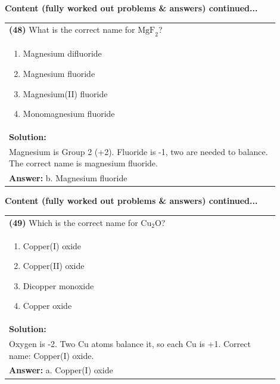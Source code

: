 \documentclass{article}
\begin{document}
{\noindent
{\large\textbf{Content (fully worked out problems & answers) continued...}}\\[0.2em]
\vspace{0.2cm}
\begin{tabular}{|p{0.9\linewidth}|}
\hline
\vspace{0.2cm}
\textbf{(48)} What is the correct name for $\text{MgF}_2$? \\
\begin{minipage}[t]{0.85\linewidth}
\begin{enumerate}[label=\alph*.]
\item Magnesium difluoride \
\item Magnesium fluoride \
\item Magnesium(II) fluoride \
\item Monomagnesium fluoride
\end{enumerate}
\end{minipage}\\
\hline
\vspace{0.2cm}
\textbf{Solution:} \\
Magnesium is Group 2 (+2). Fluoride is -1, two are needed to balance. The correct name is magnesium fluoride. \\
\hline
\vspace{0.2cm}
\textbf{Answer:} b. Magnesium fluoride \
\hline
\end{tabular}

\newpage
\noindent
{\large\textbf{Content (fully worked out problems \& answers) continued...}}\\[0.2em]
\vspace{0.2cm}
\begin{tabular}{|p{0.9\linewidth}|}
\hline
\vspace{0.2cm}
\textbf{(49)} Which is the correct name for $\text{Cu}_2\text{O}$? \\
\begin{minipage}[t]{0.85\linewidth}
\begin{enumerate}[label=\alph*.]
\item Copper(I) oxide \
\item Copper(II) oxide \
\item Dicopper monoxide \
\item Copper oxide
\end{enumerate}
\end{minipage}\\
\hline
\vspace{0.2cm}
\textbf{Solution:} \\
Oxygen is -2. Two Cu atoms balance it, so each Cu is +1. Correct name: Copper(I) oxide. \\
\hline
\vspace{0.2cm}
\textbf{Answer:} a. Copper(I) oxide \
\hline
\end{tabular}

}
\end{document}
